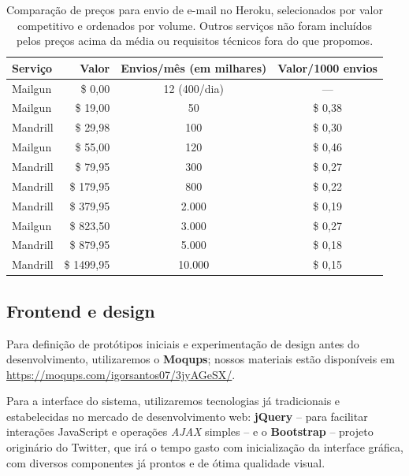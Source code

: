 \documentclass[12pt,a4paper,twoside,hyphens,english,brazil]{abntex2}
\begin{document}
{\begin{table}[h]
	\caption[Comparação de preços para envio de e-mail no Heroku]{Comparação de preços para envio de e-mail no Heroku, selecionados por valor competitivo e ordenados por volume. Outros serviços não foram incluídos pelos preços acima da média ou requisitos técnicos fora do que propomos.}
	\centering
	\begin{tabular}{|l|r|c|c|}
		\hline \textbf{Serviço}	& \textbf{Valor} & \textbf{Envios/mês} (em milhares) & \textbf{Valor/1000 envios} \\ 
		\hline Mailgun			& \$    0,00 & 12 (400/dia) &     --- \\ 
		\hline Mailgun			& \$   19,00 &     50 & \$ 0,38 \\ 
		\hline Mandrill			& \$   29,98 &    100 & \$ 0,30 \\ 
		\hline Mailgun			& \$   55,00 &    120 & \$ 0,46 \\ 
		\hline Mandrill			& \$   79,95 &    300 & \$ 0,27 \\ 
		\hline Mandrill			& \$  179,95 &    800 & \$ 0,22 \\ 
		\hline Mandrill			& \$  379,95 &  2.000 & \$ 0,19 \\ 
		\hline Mailgun			& \$  823,50 &  3.000 & \$ 0,27 \\ 
		\hline Mandrill			& \$  879,95 &  5.000 & \$ 0,18 \\ 
		\hline Mandrill			& \$ 1499,95 & 10.000 & \$ 0,15 \\ 
		\hline 
	\end{tabular}
	\label{tab:mail}
\end{table}

\subsection{Frontend e design}
Para definição de protótipos iniciais e experimentação de design antes do desenvolvimento, utilizaremos o \textbf{Moqups}; nossos materiais estão disponíveis em \url{https://moqups.com/igorsantos07/3jyAGeSX/}.

Para a interface do sistema, utilizaremos tecnologias já tradicionais e estabelecidas no mercado de desenvolvimento web: \textbf{jQuery} -- para facilitar interações JavaScript e operações \emph{AJAX} simples -- e o \textbf{Bootstrap} -- projeto originário do Twitter, que irá o tempo gasto com inicialização da interface gráfica, com diversos componentes já prontos e de ótima qualidade visual.

}
\end{document}

